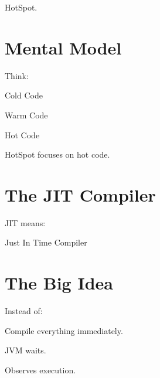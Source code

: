 \documentclass[11pt,a4paper]{book}
\begin{document}
HotSpot.


\section{Mental Model}

Think:


Cold Code


Warm Code


Hot Code


HotSpot focuses on hot code.


\section{The JIT Compiler}

JIT means:


Just In Time Compiler


\section{The Big Idea}

Instead of:


Compile everything immediately.


JVM waits.


Observes execution.

\end{document}
